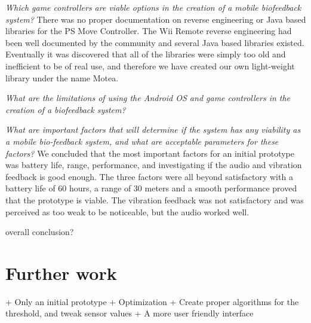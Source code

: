 \textit{Which game controllers are viable options in the creation of a mobile biofeedback system?}
There was no proper documentation on reverse engineering or Java based libraries for the PS Move Controller. The Wii Remote reverse engineering had been well documented by the community and several Java based libraries existed. Eventually it was discovered that all of the libraries were simply too old and inefficient to be of real use, and therefore we have created our own light-weight library under the name Motea.

\textit{What are the limitations of using the Android OS and game controllers in the creation of a biofeedback system?}

\textit{What are important factors that will determine if the system has any viability as a mobile bio-feedback system, and what are acceptable parameters for these factors?}
We concluded that the most important factors for an initial prototype was battery life, range, performance, and investigating if the audio and vibration feedback is good enough. The three factors were all beyond satisfactory with a battery life of 60 hours, a range of 30 meters and a smooth performance proved that the prototype is viable. The vibration feedback was not satisfactory and was perceived as too weak to be noticeable, but the audio worked well.

overall conclusion?

\section{Further work}
+ Only an initial prototype
+ Optimization
+ Create proper algorithms for the threshold, and tweak sensor values
+ A more user friendly interface
